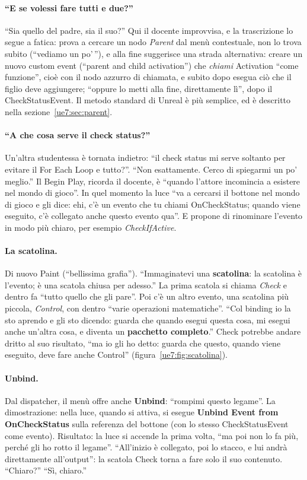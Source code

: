 \paragraph{``E se volessi fare tutti e due?''} ``Sia quello del padre, sia il suo?'' Qui
il docente improvvisa, e la trascrizione lo segue a fatica: prova a cercare un nodo
\emph{Parent} dal menù contestuale, non lo trova subito (``vediamo un po'\,''), e alla
fine suggerisce una strada alternativa: creare un nuovo custom event (``parent and
child activation'') che \emph{chiami} Activation ``come funzione'', cioè con il nodo
azzurro di chiamata, e subito dopo esegua ciò che il figlio deve aggiungere; ``oppure lo
metti alla fine, direttamente lì'', dopo il CheckStatusEvent. Il metodo standard di
Unreal è più semplice, ed è descritto nella sezione~\ref{ue7:sec:parent}.

\paragraph{``A che cosa serve il check status?''} Un'altra studentessa è tornata indietro:
``il check status mi serve soltanto per evitare il For Each Loop e tutto?''. ``Non
esattamente. Cerco di spiegarmi un po' meglio.'' Il Begin Play, ricorda il docente, è
``quando l'attore incomincia a esistere nel mondo di gioco''. In quel momento la luce ``va
a cercarsi il bottone nel mondo di gioco e gli dice: ehi, c'è un evento che tu chiami
OnCheckStatus; quando viene eseguito, c'è collegato anche questo evento qua''. E propone
di rinominare l'evento in modo più chiaro, per esempio \emph{CheckIfActive}.

\paragraph{La scatolina.} Di nuovo Paint (``bellissima grafia''). ``Immaginatevi una
\textbf{scatolina}: la scatolina è l'evento; è una scatola chiusa per adesso.'' La prima
scatola si chiama \emph{Check} e dentro fa ``tutto quello che gli pare''. Poi c'è un
altro evento, una scatolina più piccola, \emph{Control}, con dentro ``varie operazioni
matematiche''. ``Col binding io la sto aprendo e gli sto dicendo: guarda che quando esegui
questa cosa, mi esegui anche un'altra cosa, e diventa un \textbf{pacchetto completo}.''
Check potrebbe andare dritto al suo risultato, ``ma io gli ho detto: guarda che questo,
quando viene eseguito, deve fare anche Control'' (figura~\ref{ue7:fig:scatolina}).

\paragraph{Unbind.} Dal dispatcher, il menù offre anche \textbf{Unbind}: ``rompimi questo
legame''. La dimostrazione: nella luce, quando si attiva, si esegue \textbf{Unbind Event
from OnCheckStatus} sulla referenza del bottone (con lo stesso CheckStatusEvent come
evento). Risultato: la luce si accende la prima volta, ``ma poi non lo fa più, perché gli
ho rotto il legame''. ``All'inizio è collegato, poi lo stacco, e lui andrà direttamente
all'output'': la scatola Check torna a fare solo il suo contenuto. ``Chiaro?'' ``Sì,
chiaro.''

